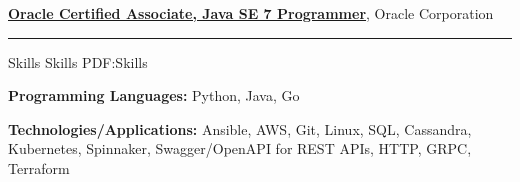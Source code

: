 \documentclass[letterpaper,MMMyyyy,nonstopmode]{simpleresumecv}
\begin{document}
\begin{Body}
\Entry
\href{http://education.oracle.com/pls/web_prod-plq-dad/db_pages.getpage?page_id=5001&get_params=p_exam_id:1Z0-803&p_org_id=&lang=}
{\textbf{Oracle Certified Associate, Java SE 7 Programmer}},
Oracle Corporation
\hfill
{}
\newline
\Gap

\hrule


\Section
{Skills}
{Skills}
{PDF:Skills}

\begin{flushleft}
\textbf{Programming Languages:} Python, Java, Go\newline

\textbf{Technologies/Applications:} Ansible, AWS, Git,  Linux, SQL, Cassandra, Kubernetes, Spinnaker, Swagger/OpenAPI for REST APIs,  HTTP, GRPC, Terraform \newline
\end{flushleft}

\end{Body}
\end{document}
